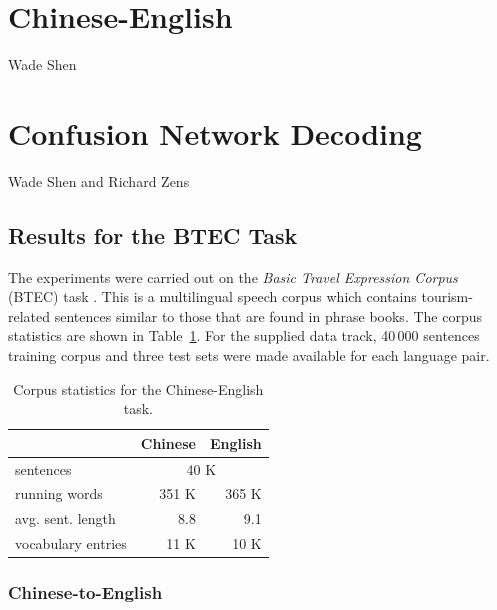 \documentclass[11pt]{report}
\theoremstyle{plain}
\begin{document}
{{}  %


\section{Chinese-English}
{\sc Wade Shen}

\section{Confusion Network Decoding}
{\sc Wade Shen and Richard Zens}


\subsection{Results for the BTEC Task}

The experiments were carried out on the {\it Basic Travel Expression Corpus} (BTEC) task \cite{takezawa02}. 
This is a multilingual speech corpus which contains tourism-related sentences similar to those that are found in phrase books.
The corpus statistics are shown in Table~\ref{tab-corpus}.
For the supplied data track, 40\,000 sentences training corpus and three test sets were made available for each language pair.

\begin{table}
\begin{center}
\caption{Corpus statistics for the Chinese-English task.} \label{tab-corpus}
\begin{tabular}{|l|r|r|}
\hline
& Chinese & English \\
\hline
sentences & \multicolumn{2}{c|}{40 K} \\ \cline{2-3}
running words & 351 K  &  365 K \\
avg. sent. length& 8.8& 9.1 \\
vocabulary entries& 11 K & 10 K \\
\hline
\end{tabular}
\end{center}
\end{table}



\subsubsection{Chinese-to-English}

}
\end{document}
